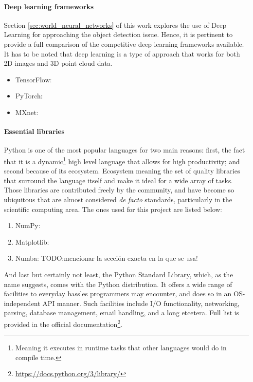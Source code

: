 \documentclass[../main.tex]{subfiles}
\begin{document}
\paragraph{Deep learning frameworks}
Section \ref{sec:world_neural_networks} of this work explores the use of Deep Learning for approaching the object detection issue. Hence, it is pertinent to provide a full comparison of the competitive deep learning frameworks available. It has to be noted that deep learning is a type of approach that works for both 2D images and 3D point cloud data.

\begin{itemize}
    \item TensorFlow:
    \item PyTorch:
    \item MXnet:
\end{itemize}

\paragraph{Essential libraries} 
Python is one of the most popular \cite{TODO:citeTIOBEindex} languages for two main reasons: first, the fact that it is a dynamic\footnote{Meaning it executes in runtime tasks that other languages would do in compile time.} high level language that allows for high productivity; and second because of its ecosystem. Ecosystem meaning the set of quality libraries that surround the language itself and make it ideal for a wide array of tasks. Those libraries are contributed freely by the community, and have become so ubiquitous that are almost considered \emph{de facto} standards, particularly in the scientific computing area. The ones used for this project are listed below:
\begin{enumerate}
    \item NumPy:
    \item Matplotlib:
    \item Numba: TODO:mencionar la sección exacta en la que se usa!
\end{enumerate}

And last but certainly not least, the Python Standard Library, which, as the name suggests, comes with the Python distribution. It offers a wide range of facilities to everyday hassles programmers may encounter, and does so in an OS-independent API manner. Such facilities include I/O functionality, networking, parsing, database management, email handling, and a long etcetera. Full list is provided in the official documentation\footnote{\url{https://docs.python.org/3/library/}}.


 
\end{document}

